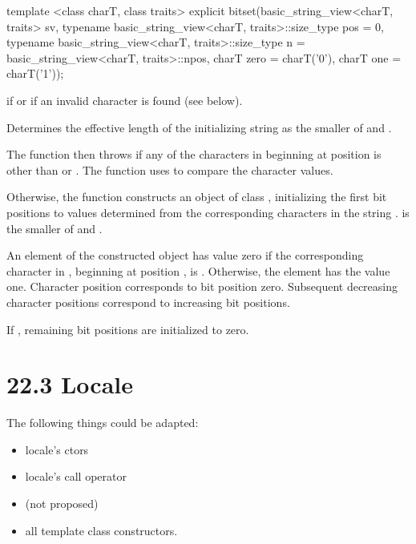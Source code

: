 \documentclass[ebook,11pt,article]{memoir}
\begin{document}
\begin{addedblock}
\begin{itemdecl}
template <class charT, class traits>
explicit
bitset(basic_string_view<charT, traits> sv,
       typename basic_string_view<charT, traits>::size_type pos = 0,
       typename basic_string_view<charT, traits>::size_type n =
         basic_string_view<charT, traits>::npos,
         charT zero = charT('0'), charT one = charT('1'));
\end{itemdecl}

\begin{itemdescr}
\pnum
\throws
{}
if
or  if an invalid character is found (see below).%

\pnum
\effects
Determines the effective length
 of the initializing string as the smaller of
 and
.

The function then throws%
if any of the 
characters in  beginning at position  is
other than  or . The function uses 
to compare the character values.

Otherwise, the function constructs an object of class
,
initializing the first  bit
positions to values determined from the corresponding characters in the string
.
 is the smaller of  and .

\pnum
An element of the constructed object has value zero if the
corresponding character in , beginning at position
, is
.
Otherwise, the element has the value one.
Character position  corresponds to bit position zero.
Subsequent decreasing character positions correspond to increasing bit positions.

\pnum
If , remaining bit positions are initialized to zero.
\end{itemdescr}
\end{addedblock}

\section{22.3 Locale}
The following things could be adapted:
\begin{itemize}
\item locale's ctors 
\item locale's call operator
\item {} (not proposed)
\item all  template class constructors.
\end{itemize}
\end{document}
